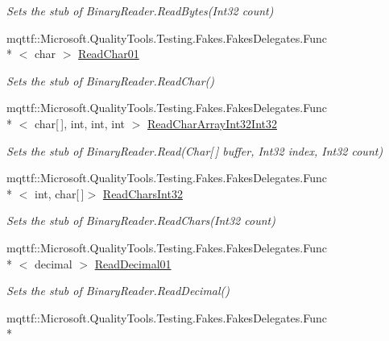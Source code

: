 \begin{DoxyCompactItemize}
\begin{DoxyCompactList}\small\item\em Sets the stub of Binary\-Reader.\-Read\-Bytes(\-Int32 count)\end{DoxyCompactList}\item 
mqttf\-::\-Microsoft.\-Quality\-Tools.\-Testing.\-Fakes.\-Fakes\-Delegates.\-Func\\*
$<$ char $>$ \hyperlink{class_system_1_1_i_o_1_1_fakes_1_1_stub_binary_reader_a1932ca0fee22013df724e74ee7203d75}{Read\-Char01}
\begin{DoxyCompactList}\small\item\em Sets the stub of Binary\-Reader.\-Read\-Char()\end{DoxyCompactList}\item 
mqttf\-::\-Microsoft.\-Quality\-Tools.\-Testing.\-Fakes.\-Fakes\-Delegates.\-Func\\*
$<$ char\mbox{[}$\,$\mbox{]}, int, int, int $>$ \hyperlink{class_system_1_1_i_o_1_1_fakes_1_1_stub_binary_reader_a8f63f2824a6d562de233a67c249feaeb}{Read\-Char\-Array\-Int32\-Int32}
\begin{DoxyCompactList}\small\item\em Sets the stub of Binary\-Reader.\-Read(\-Char\mbox{[}$\,$\mbox{]} buffer, Int32 index, Int32 count)\end{DoxyCompactList}\item 
mqttf\-::\-Microsoft.\-Quality\-Tools.\-Testing.\-Fakes.\-Fakes\-Delegates.\-Func\\*
$<$ int, char\mbox{[}$\,$\mbox{]}$>$ \hyperlink{class_system_1_1_i_o_1_1_fakes_1_1_stub_binary_reader_ab7c3d2dd7a8f0acbcd63340c147f32e0}{Read\-Chars\-Int32}
\begin{DoxyCompactList}\small\item\em Sets the stub of Binary\-Reader.\-Read\-Chars(\-Int32 count)\end{DoxyCompactList}\item 
mqttf\-::\-Microsoft.\-Quality\-Tools.\-Testing.\-Fakes.\-Fakes\-Delegates.\-Func\\*
$<$ decimal $>$ \hyperlink{class_system_1_1_i_o_1_1_fakes_1_1_stub_binary_reader_a94e4483c6ce663e8b2ccf0b5849324f8}{Read\-Decimal01}
\begin{DoxyCompactList}\small\item\em Sets the stub of Binary\-Reader.\-Read\-Decimal()\end{DoxyCompactList}\item 
mqttf\-::\-Microsoft.\-Quality\-Tools.\-Testing.\-Fakes.\-Fakes\-Delegates.\-Func\\*

\end{DoxyCompactItemize}
